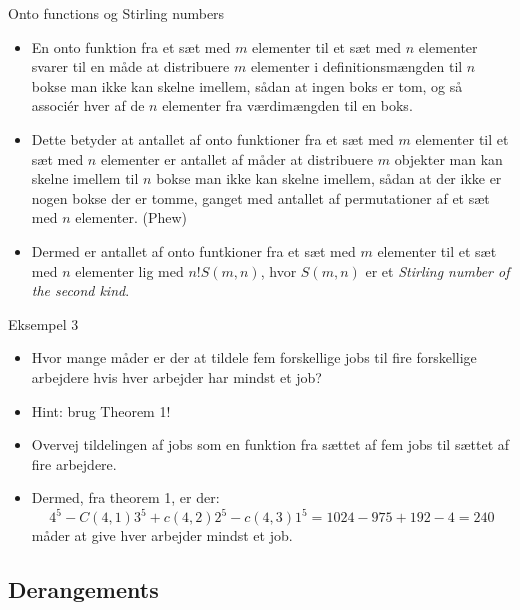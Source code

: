 \documentclass{beamer}
\begin{document}
\begin{frame}[allowframebreaks]{Onto functions og Stirling numbers}
   \begin{itemize}
       \item En onto funktion fra et sæt med $m$ elementer til et sæt med $n$ elementer svarer til en måde at distribuere $m$ elementer i definitionsmængden til $n$ bokse man ikke kan skelne imellem, sådan at ingen boks er tom, og så associér hver af de $n$ elementer fra værdimængden til en boks.
       \item Dette betyder at antallet af onto funktioner fra et sæt med $m$ elementer til et sæt med $n$ elementer er antallet af måder at distribuere $m$ objekter man kan skelne imellem til $n$ bokse man ikke kan skelne imellem, sådan at der ikke er nogen bokse der er tomme, ganget med antallet af permutationer af et sæt med $n$ elementer. (Phew)
       \item Dermed er antallet af onto funtkioner fra et sæt med $m$ elementer til et sæt med $n$ elementer lig med $n!S(m,n)$, hvor $S(m,n)$ er et \textit{Stirling number of the second kind}. 
   \end{itemize} 
\end{frame}

\begin{frame}{Eksempel 3}
   \begin{itemize}
       \item<1-> Hvor mange måder er der at tildele fem forskellige jobs til fire forskellige arbejdere hvis hver arbejder har mindst et job? 
       \item<1-> Hint: brug Theorem 1!
       \item<2-> Overvej tildelingen af jobs som en funktion fra sættet af fem jobs til sættet af fire arbejdere. 
       \item<3-> Dermed, fra theorem 1, er der: $$4^5 - C(4,1)3^5 + c(4,2)2^5-c(4,3)1^5=1024-975+192-4=240$$ måder at give hver arbejder mindst et job.
   \end{itemize} 
\end{frame}

\subsection{Derangements}
\end{document}
